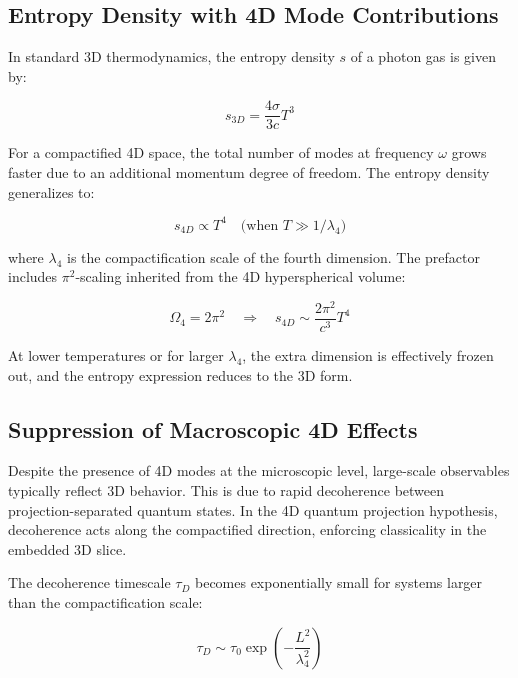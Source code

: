 \documentclass[12pt,a4paper]{article}
\begin{document}
\subsection{Entropy Density with 4D Mode Contributions}

In standard 3D thermodynamics, the entropy density \(s\) of a photon gas is given by:

\begin{equation}
s_{3D} = \frac{4 \sigma}{3 c} T^3
\end{equation}

For a compactified 4D space, the total number of modes at frequency \(\omega\) grows faster due to an additional momentum degree of freedom. The entropy density generalizes to:

\begin{equation}
s_{4D} \propto T^4 \quad \text{(when } T \gg 1/\lambda_4 \text{)}
\end{equation}

where \(\lambda_4\) is the compactification scale of the fourth dimension. The prefactor includes \(\pi^2\)-scaling inherited from the 4D hyperspherical volume:

\begin{equation}
\Omega_4 = 2\pi^2 \quad \Rightarrow \quad s_{4D} \sim \frac{2\pi^2}{c^3} T^4
\end{equation}

At lower temperatures or for larger \(\lambda_4\), the extra dimension is effectively frozen out, and the entropy expression reduces to the 3D form.

\subsection{Suppression of Macroscopic 4D Effects}

Despite the presence of 4D modes at the microscopic level, large-scale observables typically reflect 3D behavior. This is due to rapid decoherence between projection-separated quantum states. In the 4D quantum projection hypothesis, decoherence acts along the compactified direction, enforcing classicality in the embedded 3D slice.

The decoherence timescale \(\tau_D\) becomes exponentially small for systems larger than the compactification scale:

\begin{equation}
\tau_D \sim \tau_0 \exp\left(-\frac{L^2}{\lambda_4^2}\right)
\end{equation}
\end{document}
